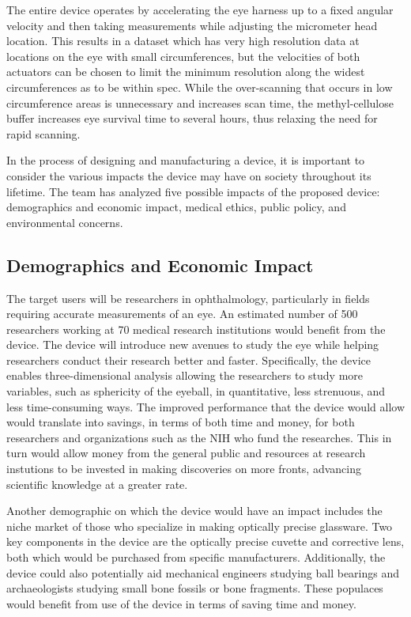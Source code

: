 \documentclass{article}
\begin{document}
The entire device operates by accelerating the eye harness up to a fixed angular velocity and then taking measurements while adjusting the micrometer head location. This results in a dataset which has very high resolution data at locations on the eye with small circumferences, but the velocities of both actuators can be chosen to limit the minimum resolution along the widest circumferences as to be within spec. While the over-scanning that occurs in low circumference areas is unnecessary and increases scan time, the methyl-cellulose buffer increases eye survival time to several hours, thus relaxing the need for rapid scanning.
 
In the process of designing and manufacturing a device, it is important to consider the various impacts the device may have on society throughout its lifetime. The team has analyzed five possible impacts of the proposed device: demographics and economic impact, medical ethics, public policy, and environmental concerns. 
 
 
\subsection{Demographics and Economic Impact}
\label{sec:Demographics}
 
The target users will be researchers in ophthalmology, particularly in
fields requiring accurate measurements of an eye. An estimated number
of 500 researchers working at 70 medical research institutions would
benefit from the device. The device will introduce new avenues to
study the eye while helping researchers conduct their research better
and faster. Specifically, the device enables three-dimensional
analysis allowing the researchers to study more variables, such as
sphericity of the eyeball, in quantitative, less strenuous, and less
time-consuming ways. The improved performance that the device would
allow would translate into savings, in terms of both time and money,
for both researchers and organizations such as the NIH who fund the
researches. This in turn would allow money from the general public and
resources at research instutions to be invested in making discoveries
on more fronts, advancing scientific knowledge at a greater
rate. 
 
Another demographic on which the device would have an impact includes
the niche market of those who specialize in making optically precise
glassware. Two key components in the device are the optically precise
cuvette and corrective lens, both which would be purchased from
specific manufacturers. Additionally, the device could also
potentially aid mechanical engineers studying ball bearings and
archaeologists studying small bone fossils or bone fragments. These
populaces would  benefit from use of the device in terms of saving time and money. 
\end{document}
